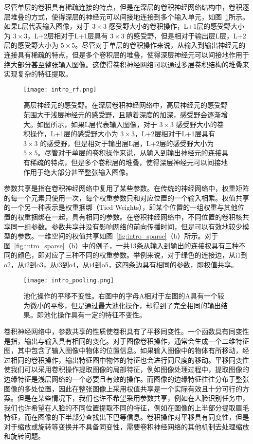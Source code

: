 尽管单层的卷积具有稀疏连接的特点，但是在深层的卷积神经网络结构中，卷积逐层堆叠的方式，使得深层的神经元可以间接地连接到多个输入单元，如图~\ref{fig:intro_rf}所示。如果L层代表输入图像，对于 $3\times3$ 感受野大小的卷积操作，L+1层的感受野大小为 $3\times3$，L+2层相对于L+1层具有 $3\times3$ 的感受野，但是相对于输出层L层，L+2层的感受野大小为 $5\times5$。尽管对于单层的卷积操作来说，从输入到输出神经元的连接具有稀疏的特点，但是多个卷积层的堆叠，使得深层神经元可以间接地作用于绝大部分甚至整张输入图像。这使得卷积神经网络可以通过多层卷积结构的堆叠来实现复杂的特征提取。

\begin{figure}
\centering
\texttt{[image: intro\_rf.png]}
\caption{高层神经元的感受野。在深层卷积神经网络中，高层神经元的感受野范围大于浅层神经元的感受野，且随着深度的加深，感受野会逐渐增大。如图所示，如果L层代表输入图像，对于 $3\times3$ 感受野大小的卷积操作，L+1层的感受野大小为 $3\times3$，L+2层相对于L+1层具有 $3\times3$ 的感受野，但是相对于输出层L层，L+2层的感受野大小为 $5\times5$。尽管对于单层的卷积操作来说，从输入到输出神经元的连接具有稀疏的特点，但是多个卷积层的堆叠，使得深层神经元可以间接地作用于绝大部分甚至整张输入图像。}
\label{fig:intro_rf}
\end{figure}

参数共享是指在卷积神经网络中复用了某些参数。在传统的神经网络中，权重矩阵的每一个元素只使用一次，每个权重参数只和对应位置的一个输入相乘。权值共享的一个另一种表示是权重捆绑（Tied Weights），即某个位置的一组权重与其他位置的权重捆绑在一起，具有相同的参数。在卷积神经网络中，不同位置的卷积核共享同一组参数。参数共享并没有影响网络的前向传播时间，但是可以有效地较少模型的参数。一维空间的权值共享如图~\ref{fig:intro_sparse}（b）所示。对于图~\ref{fig:intro_sparse}（b）中的例子，一共13条从输入到输出的连接权具有三种不同的颜色，即对应了三种不同的权重参数。举例来说，对于绿色的连接边，从i1到o2，从i2到o3，从i3到o4，从i4到o5，这四条边具有相同的参数，即权值共享。

\begin{figure}
\centering
\texttt{[image: intro\_pooling.png]}
\caption{池化操作的平移不变性。右图中的字母A相对于左图的A具有一个较为微小的平移，但是通过最大池化操作，却得到了完全相同的输出结果。即池化操作具有一定的特征不变性。}
\label{fig:intro_pooling}
\end{figure}

卷积神经网络中，参数共享的性质使卷积具有了平移同变性。一个函数具有同变性是指，输出与输入具有相同的变化。对于图像卷积操作，通常会生成一个二维特征图，其中包含了输入图像中物体的位置信息。如果输入图像中的物体有所移动，经过相同的卷积操作，输出特征图中物体的特征也会进行同尺度的移动。平移同变性使我们可以采用卷积操作提取图像的局部特征，例如图像处理过程中，提取图像的边缘特征是浅层网络的一个必要且有效的操作。而图像的边缘特征往往分布于整张图像的多处位置，因此在整张图像上采用权值共享是一个实际有效且十分可行的方案。但是在某些情况下，我们也许不希望采用参数共享，例如在人脸识别任务中，我们也许希望在人脸的不同位置提取不同的特征，例如在图像的上半部分提取眉毛特征，而在图像的下半部分查找出下巴等信息。卷积操作对平移具有同变性，但是对于缩放或旋转等变换并不具备同变性，需要卷积神经网络的其他机制去处理缩放和旋转问题。


